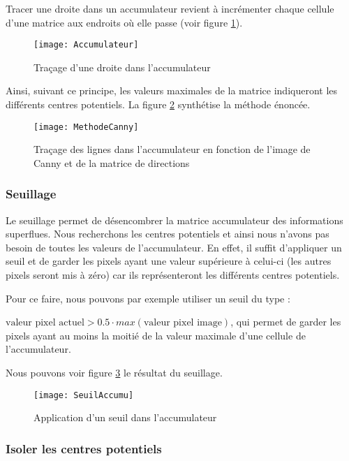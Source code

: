Tracer une droite dans un accumulateur revient à incrémenter chaque cellule d’une matrice aux endroits où elle passe (voir figure \ref{fig:Accumulateur}).

\begin{figure}[h]
  \centering
  \texttt{[image: Accumulateur]}
  \caption{Traçage d’une droite dans l’accumulateur}
  \label{fig:Accumulateur}
\end{figure}

Ainsi, suivant ce principe, les valeurs maximales de la matrice indiqueront les différents centres potentiels. La figure \ref{fig:MethodeCanny} synthétise la méthode énoncée. 

\begin{figure}[h]
  \centering
  \texttt{[image: MethodeCanny]}
  \caption{Traçage des lignes dans l’accumulateur en fonction de l’image de Canny et de la matrice de directions}
  \label{fig:MethodeCanny}
\end{figure}

\subsubsection{Seuillage}

Le seuillage permet de désencombrer la matrice accumulateur des informations superflues. Nous recherchons les centres potentiels et ainsi nous n’avons pas besoin de toutes les valeurs de l’accumulateur. En effet, il suffit d’appliquer un seuil et de garder les pixels ayant une valeur supérieure à celui-ci (les autres pixels seront mis à zéro) car ils représenteront les différents centres potentiels. 

Pour ce faire, nous pouvons par exemple utiliser un seuil du type :

$\text{valeur pixel actuel} > 0.5 \cdot max(\text{valeur pixel image})$, qui permet de garder les pixels ayant au moins la moitié de la valeur maximale d’une cellule de l’accumulateur.

Nous pouvons voir figure \ref{fig:SeuilAccumu} le résultat du seuillage.

\begin{figure}[h]
  \centering
  \texttt{[image: SeuilAccumu]}
  \caption{Application d’un seuil dans l’accumulateur}
  \label{fig:SeuilAccumu}
\end{figure}

\subsubsection{Isoler les centres potentiels}

